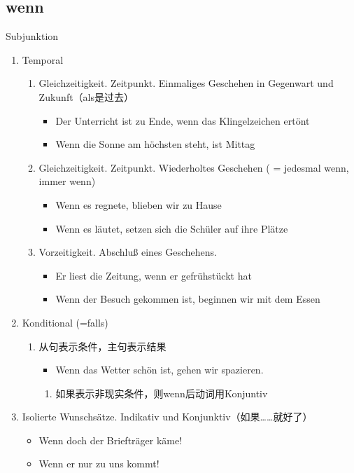 \documentclass[UTF8]{report}
\begin{document}
\subsection{wenn}
Subjunktion
\begin{enumerate}
    \item Temporal
    \begin{enumerate}
        \item Gleichzeitigkeit. Zeitpunkt. Einmaliges Geschehen in Gegenwart und Zukunft（als是过去）
        \begin{itemize}
            \item Der Unterricht ist zu Ende, wenn das Klingelzeichen ertönt
            \item Wenn die Sonne am höchsten steht, ist Mittag
        \end{itemize}
        \item Gleichzeitigkeit. Zeitpunkt. Wiederholtes Geschehen ( = jedesmal wenn, immer wenn)
        \begin{itemize}
            \item Wenn es regnete, blieben wir zu Hause
            \item Wenn es läutet, setzen sich die Schüler auf ihre Plätze
        \end{itemize}
        \item Vorzeitigkeit. Abschluß eines Geschehens.
        \begin{itemize}
            \item Er liest die Zeitung, wenn er gefrühstückt hat
            \item Wenn der Besuch gekommen ist, beginnen wir mit dem Essen
        \end{itemize}
    \end{enumerate}
    \item Konditional (=falls)
    \begin{enumerate}
        \item 从句表示条件，主句表示结果
        \begin{itemize}
            \item Wenn das Wetter schön ist, gehen wir spazieren.
        \end{itemize}
        \begin{enumerate}
            \item 如果表示非现实条件，则wenn后动词用Konjuntiv
        \end{enumerate}
    \end{enumerate}
    \item Isolierte Wunschsätze. Indikativ und Konjunktiv（如果……就好了）
    \begin{itemize}
        \item Wenn doch der Briefträger käme!
        \item Wenn er nur zu uns kommt!
    \end{itemize}
\end{enumerate}
\end{document}

